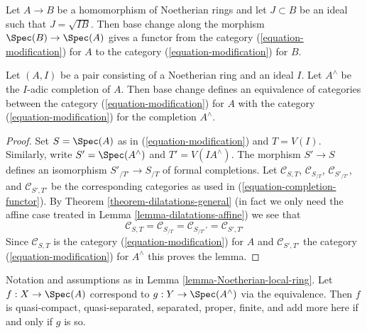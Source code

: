 \medskip\noindent
Let $A \to B$ be a homomorphism of Noetherian rings and let $J \subset B$
be an ideal such that $J = \sqrt{I B}$. Then base
change along the morphism $\Spec(B) \to \Spec(A)$ gives a functor
from the category (\ref{equation-modification}) for $A$
to the category (\ref{equation-modification}) for $B$.

\begin{lemma}
\label{lemma-Noetherian-local-ring}
Let $(A, I)$ be a pair consisting of a Noetherian ring and an ideal $I$.
Let $A^\wedge$ be the $I$-adic completion of $A$. Then base change defines
an equivalence of categories between the category (\ref{equation-modification})
for $A$ with the category (\ref{equation-modification}) for the completion
$A^\wedge$.
\end{lemma}

\begin{proof}
Set $S = \Spec(A)$ as in (\ref{equation-modification}) and $T = V(I)$.
Similarly, write $S' = \Spec(A^\wedge)$ and $T' = V(IA^\wedge)$.
The morphism $S' \to S$ defines an isomorphism $S'_{/T'} \to S_{/T}$
of formal completions. Let $\mathcal{C}_{S, T}$, $\mathcal{C}_{S_{/T}}$,
$\mathcal{C}_{S'_{/T'}}$, and $\mathcal{C}_{S', T'}$ be the corresponding
categories as used in (\ref{equation-completion-functor}).
By Theorem \ref{theorem-dilatations-general} (in fact we only need
the affine case treated in Lemma \ref{lemma-dilatations-affine})
we see that
$$
\mathcal{C}_{S, T} = \mathcal{C}_{S_{/T}} =
\mathcal{C}_{S_{/T'}'} = \mathcal{C}_{S', T'}
$$
Since $\mathcal{C}_{S, T}$ is the category (\ref{equation-modification})
for $A$ and $\mathcal{C}_{S', T'}$ the category (\ref{equation-modification})
for $A^\wedge$ this proves the lemma.
\end{proof}

\begin{lemma}
\label{lemma-Noetherian-local-ring-properties}
Notation and assumptions as in Lemma \ref{lemma-Noetherian-local-ring}.
Let $f : X \to \Spec(A)$ correspond to $g : Y \to \Spec(A^\wedge)$
via the equivalence. Then $f$ is quasi-compact, quasi-separated, separated,
proper, finite, and add more here if and only if $g$ is so.
\end{lemma}

